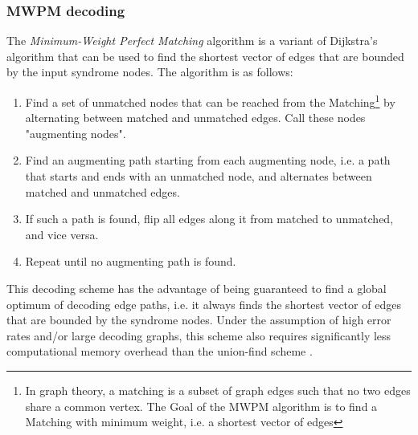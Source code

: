 \subsubsection{MWPM decoding}
The \emph{Minimum-Weight Perfect Matching} algorithm is a variant of 
Dijkstra's algorithm that can be used to find the shortest vector of edges
that are bounded by the input syndrome nodes.
The algorithm is as follows:
\begin{enumerate}
    \item Find a set of unmatched nodes that can be reached from the 
    Matching\footnote{In graph theory, a matching is a subset of graph
    edges such that no two edges share a common vertex. The Goal of the MWPM
    algorithm is to find a Matching with minimum weight, i.e. a shortest vector of
    edges} by alternating between matched and unmatched edges. 
    Call these nodes "augmenting nodes".
    \item Find an augmenting path starting from each augmenting node,
    i.e. a path that starts and ends with an unmatched node, and
    alternates between matched and unmatched edges. 
    \item If such a path is found, flip all edges along it from matched
    to unmatched, and vice versa.
    \item Repeat until no augmenting path is found.
\end{enumerate}

This decoding scheme has the advantage of being guaranteed
to find a global optimum of decoding edge paths, i.e. it always finds the shortest vector
of edges that are bounded by the syndrome nodes.
Under the assumption of high error rates and/or large decoding 
graphs, this scheme also requires significantly less
computational memory overhead than the union-find scheme
\cite{MWPMDecoder}.